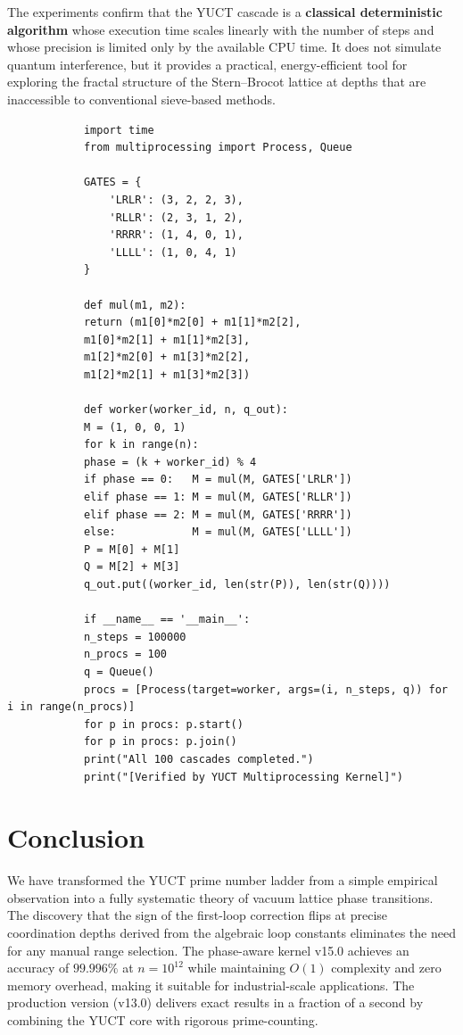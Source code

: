 \documentclass[12pt,a4paper]{article}
\begin{document}
	The experiments confirm that the YUCT cascade is a \textbf{classical
		deterministic algorithm} whose execution time scales linearly with the
	number of steps and whose precision is limited only by the available
	CPU time.  It does not simulate quantum interference, but it provides a
	practical, energy-efficient tool for exploring the fractal structure of
	the Stern--Brocot lattice at depths that are inaccessible to
	conventional sieve-based methods.
	
	\begin{tcolorbox}[title=Parallel Cascade Benchmark (Python), breakable]
		\begin{lstlisting}
			import time
			from multiprocessing import Process, Queue
			
			GATES = {
				'LRLR': (3, 2, 2, 3),
				'RLLR': (2, 3, 1, 2),
				'RRRR': (1, 4, 0, 1),
				'LLLL': (1, 0, 4, 1)
			}
			
			def mul(m1, m2):
			return (m1[0]*m2[0] + m1[1]*m2[2],
			m1[0]*m2[1] + m1[1]*m2[3],
			m1[2]*m2[0] + m1[3]*m2[2],
			m1[2]*m2[1] + m1[3]*m2[3])
			
			def worker(worker_id, n, q_out):
			M = (1, 0, 0, 1)
			for k in range(n):
			phase = (k + worker_id) % 4
			if phase == 0:   M = mul(M, GATES['LRLR'])
			elif phase == 1: M = mul(M, GATES['RLLR'])
			elif phase == 2: M = mul(M, GATES['RRRR'])
			else:            M = mul(M, GATES['LLLL'])
			P = M[0] + M[1]
			Q = M[2] + M[3]
			q_out.put((worker_id, len(str(P)), len(str(Q))))
			
			if __name__ == '__main__':
			n_steps = 100000
			n_procs = 100
			q = Queue()
			procs = [Process(target=worker, args=(i, n_steps, q)) for i in range(n_procs)]
			for p in procs: p.start()
			for p in procs: p.join()
			print("All 100 cascades completed.")
			print("[Verified by YUCT Multiprocessing Kernel]")
		\end{lstlisting}
	\end{tcolorbox}
	
	\section{Conclusion}
	\label{sec:conclusion}
	We have transformed the YUCT prime number ladder from a simple empirical observation into a fully systematic theory of vacuum lattice phase transitions.  The discovery that the sign of the first-loop correction flips at precise coordination depths derived from the algebraic loop constants eliminates the need for any manual range selection.  The phase-aware kernel v15.0 achieves an accuracy of \(99.996\%\) at \(n=10^{12}\) while maintaining \(O(1)\) complexity and zero memory overhead, making it suitable for industrial-scale applications.  The production version (v13.0) delivers exact results in a fraction of a second by combining the YUCT core with rigorous prime-counting.
	
\end{document}
